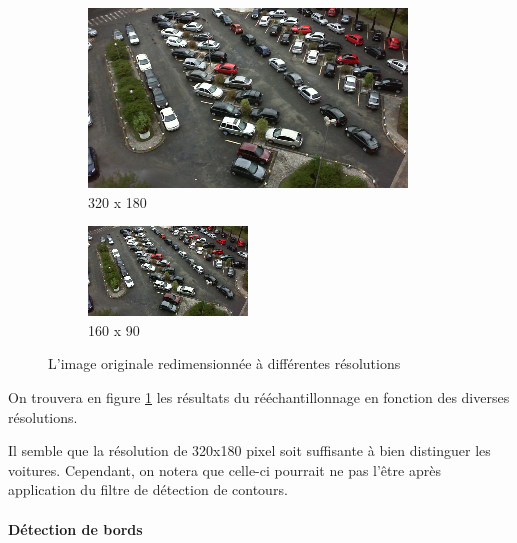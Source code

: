 \begin{figure}[H]
    \bigskip
    \begin{subfigure}{.5\textwidth}
        \centering
        \includegraphics[width=.85\linewidth]{img/conception/image_process/downsample_only/1.png}
        \caption{320 x 180}
    \end{subfigure}%
    \begin{subfigure}{.5\textwidth}
        \centering
        \includegraphics[width=.85\linewidth]{img/conception/image_process/downsample_only/0.png}
        \caption{160 x 90}
    \end{subfigure}%
    \centering
    \caption{L'image originale redimensionnée à différentes résolutions}
    \label{fig:image_process_downsampling}
\end{figure}

On trouvera en figure \ref{fig:image_process_downsampling} les résultats du rééchantillonnage en fonction des diverses résolutions.

Il semble que la résolution de 320x180 pixel soit suffisante à bien distinguer les voitures. Cependant, on notera que celle-ci pourrait ne pas l'être après application du filtre de détection de contours.

\paragraph{Détection de bords}

